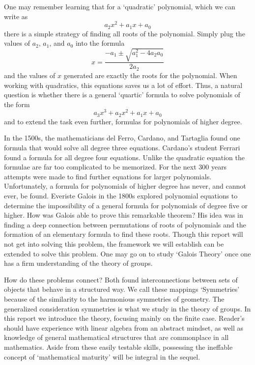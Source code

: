 \documentclass[12pt]{amsbook}
\theoremstyle{definition}
\begin{document}
One may remember learning that for a `quadratic' polynomial, which we can write as
%
\[ a_2x^2 + a_1x + a_0 \]
%
there is a simple strategy of finding all roots of the polynomial. Simply plug the values of $a_2$, $a_1$, and $a_0$ into the formula
%
\[ x = \frac{-a_1 \pm \sqrt{a_1^2 - 4a_2a_0}}{2a_2} \]
%
and the values of $x$ generated are exactly the roots for the polynomial. When working with quadratics, this equations saves us a lot of effort. Thus, a natural question is whether there is a general `quartic' formula to solve polynomials of the form
%
\[ a_3x^3 + a_2x^2 + a_1x + a_0 \]
%
and to extend the task even further, formulas for polynomials of higher degree.

In the 1500s, the mathematicians del Ferro, Cardano, and Tartaglia found one formula that would solve all degree three equations. Cardano's student Ferrari found a formula for all degree four equations. Unlike the quadratic equation the formulae are far too complicated to be memorized. For the next 300 years attempts were made to find further equations for larger polynomials. Unfortunately, a formula for polynomials of higher degree has never, and cannot ever, be found. Everiste Galois in the 1800s explored polynomial equations to determine the impossibility of a general formula for polynomials of degree five or higher. How was Galois able to prove this remarkable theorem? His idea was in finding a deep connection between permutations of roots of polynomials and the formation of an elementary formula to find these roots. Though this report will not get into solving this problem, the framework we will establish can be extended to solve this problem. One may go on to study `Galois Theory' once one has a firm understanding of the theory of groups.

How do these problems connect? Both found interconnections between sets of objects that behave in a structured way. We call these mappings `Symmetries' because of the similarity to the harmonious symmetries of geometry. The generalized consideration symmetries is what we study in the theory of groups. In this report we introduce the theory, focusing mainly on the finite case. Reader's should have experience with linear algebra from an abstract mindset, as well as knowledge of general mathematical structures that are commonplace in all mathematics. Aside from these easily testable skills, possessing the ineffable concept of `mathematical maturity' will be integral in the sequel.
\end{document}

